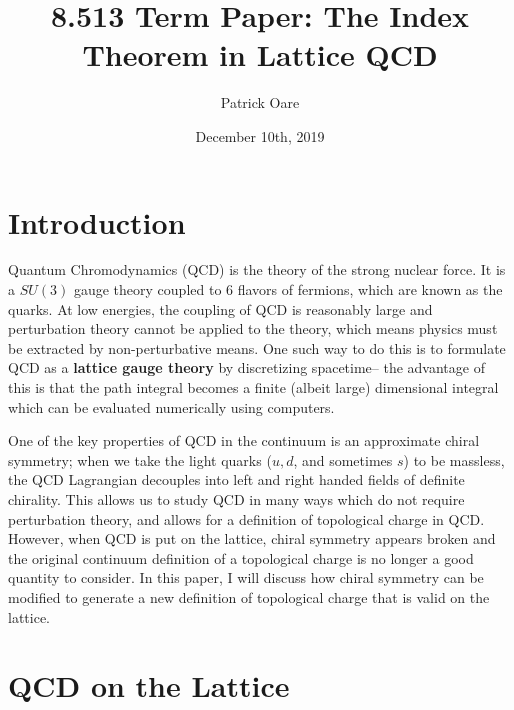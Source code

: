 \documentclass[11pt, oneside]{article}   	%
\title{8.513 Term Paper: The Index Theorem in Lattice QCD}
\author{Patrick Oare}
\date{December 10th, 2019}							%
\theoremstyle{definition}
\begin{document}
\maketitle
\section{Introduction}

Quantum Chromodynamics (QCD) is the theory of the strong nuclear force. It is a $SU(3)$ gauge theory coupled to 6 flavors of 
fermions, which are known as the quarks. At low energies, the coupling of QCD is reasonably large and perturbation theory cannot 
be applied to the theory, which means physics must be extracted by non-perturbative means. One such way to do this is to formulate 
QCD as a \textbf{lattice gauge theory} by discretizing spacetime-- the advantage of this is that the path integral becomes a finite 
(albeit large) dimensional integral which can be evaluated numerically using computers. 

One of the key properties of QCD in the continuum is an approximate chiral symmetry; when we take the light quarks ($u, d$, and 
sometimes $s$) to be massless, the QCD Lagrangian decouples into left and right handed fields of definite chirality. This allows us to 
study QCD in many ways which do not require perturbation theory, and allows for a definition of topological charge in QCD. However, 
when QCD is put on the lattice, chiral symmetry appears broken and the original continuum definition of a topological charge is no 
longer a good quantity to consider. In this paper, I will discuss how chiral symmetry can be modified to generate a new definition of 
topological charge that is valid on the lattice. 

\section{QCD on the Lattice}
\end{document}
